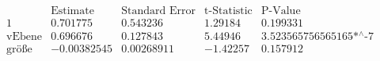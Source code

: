 \[\begin{array}{l|llll}
 \text{} & \text{Estimate} & \text{Standard Error} & \text{t-Statistic} & \text{P-Value} \\
\hline
 1 & 0.701775 & 0.543236 & 1.29184 & 0.199331 \\
 \text{vEbene} & 0.696676 & 0.127843 & 5.44946 & \text{3.523565756565165$\grave{ }$*${}^{\wedge}$-7} \\
 \text{gr{\" o}{\ss}e} & -0.00382545 & 0.00268911 & -1.42257 & 0.157912 \\
\end{array}\]

